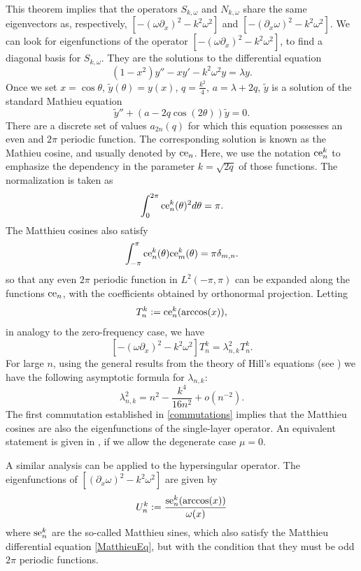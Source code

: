 \documentclass[a4paper]{article}
\begin{document}
	This theorem implies that the operators $S_{k,\omega}$ and $N_{k,\omega}$ share the same eigenvectors as, respectively, $\left[-(\omega \partial_x)^2 - k^2\omega^2\right]$ and $ \left[-(\partial_x \omega)^2 - k^2\omega^2\right]$. We can look for eigenfunctions of the operator $\left[ -(\omega \partial_x)^2 - k^2\omega^2\right]$, to find a diagonal basis for $S_{k,\omega}$. They are the solutions to the differential equation 
	\[ (1-x^2) y'' - x y' - k^2 \omega^2 y = \lambda y.\]
	Once we set $x = \cos \theta$, $\tilde{y}(\theta) = y(x)$,  $q = \frac{k^2}{4}$, $a = \lambda + 2q$, $\tilde{y}$ is a solution of the standard Mathieu equation 
	\begin{equation}
	\label{MatthieuEq}
		\tilde{y}'' + (a - 2q \cos(2\theta)) \tilde{y} = 0.
	\end{equation}
	There are a discrete set of values $a_{2n}(q)$ for which this equation possesses an even and $2\pi$ periodic function. The corresponding solution is known as the Mathieu cosine, and usually denoted by $\textup{ce}_n$. Here, we use the notation $\textup{ce}^k_n$ to emphasize the dependency in the parameter $k = \sqrt{2q}$ of those functions. The normalization is taken as
	\[ \int_{0}^{2\pi} \textup{ce}^k_n(\theta)^2 d\theta = \pi.\]
 	The Matthieu cosines also satisfy
	\[ \int_{-\pi}^{\pi}\textup{ce}^k_n(\theta) \textup{ce}^k_m(\theta) = \pi \delta_{m,n}.\]
	so that any even $2\pi$ periodic function in $L^2(-\pi,\pi)$ can be expanded along the functions $\textup{ce}_n$, with the coefficients obtained by orthonormal projection. Letting 
	\[T_{n}^k \mathrel{\mathop:}= \textup{ce}^k_n(\arccos(x)),\]
	in analogy to the zero-frequency case, we have
	\[\left[-(\omega \partial_x)^2 - k^2\omega^2\right] T_{n}^k = \lambda_{n,k}^2 T_{n}^k.\]
	For large $n$, using the general results from the theory of Hill's equations (see \cite[eq. 28.29.21]{NIST:DLMF}) we have the following asymptotic formula for $\lambda_{n,k}$:
	\[ \lambda_{n,k}^2 = n^2 - \frac{k^4}{16n^2} +o \left(n^{-2}\right). \]
	The first commutation established in \autoref{commutations} implies that the Matthieu cosines are also the eigenfunctions of the single-layer operator. An equivalent statement is given in \cite[Thm 4.2]{betcke2014spectral}, if we allow the degenerate case $\mu = 0$. 
	
	A similar analysis can be applied to the hypersingular operator. The eigenfunctions of $\left[(\partial_x \omega)^2 - k^2 \omega^2\right]$ are given by 
	\[U_n^k \mathrel{\mathop:}= \frac{\textup{se}_n^k(\arccos(x))}{\omega(x)}\]
	where $\textup{se}_n^k$ are the so-called Matthieu sines, which also satisfy the Matthieu differential equation \eqref{MatthieuEq}, but with the condition that they must be odd $2\pi$ periodic functions. 
	
\end{document}
